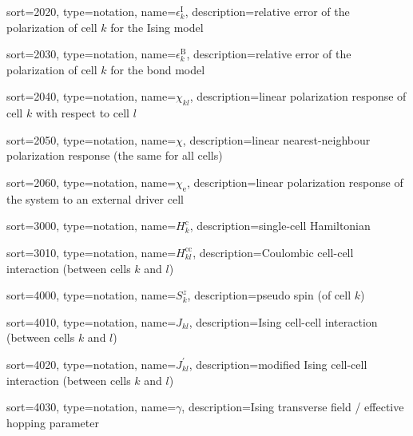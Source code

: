 {
  sort=2020,
  type=notation,
  name={\ensuremath{\epsilon^\text{I}_k}},
  description={relative error of the polarization of cell $k$ for the Ising
  model}
}

{
  sort=2030,
  type=notation,
  name={\ensuremath{\epsilon^\text{B}_k}},
  description={relative error of the polarization of cell $k$ for the bond
  model}
}

{
  sort=2040,
  type=notation,
  name={\ensuremath{\chi_{kl}}},
  description={linear polarization response of cell $k$ with respect to cell $l$}
}

{
  sort=2050,
  type=notation,
  name={\ensuremath{\chi}},
  description={linear nearest-neighbour polarization response (the same for all
  cells)}
}

{
  sort=2060,
  type=notation,
  name={\ensuremath{\chi_\text{e}}},
  description={linear polarization response of the system to an external driver
  cell}
}

{
  sort=3000,
  type=notation,
  name={\ensuremath{H^\text{c}_k}},
  description={single-cell Hamiltonian}
}

{
  sort=3010,
  type=notation,
  name={\ensuremath{H^\text{cc}_{kl}}},
  description={Coulombic cell-cell interaction (between cells $k$ and $l$)}
}

{
  sort=4000,
  type=notation,
  name={\ensuremath{S^z_k}},
  description={pseudo spin (of cell $k$)}
}

{
  sort=4010,
  type=notation,
  name={\ensuremath{J_{kl}}},
  description={Ising cell-cell interaction (between cells $k$ and $l$)}
}

{
  sort=4020,
  type=notation,
  name={\ensuremath{J^{\prime}_{kl}}},
  description={modified Ising cell-cell interaction (between cells $k$ and $l$)}
}

{
  sort=4030,
  type=notation,
  name={\ensuremath{\gamma}},
  description={Ising transverse field / effective hopping parameter}
}

\glsaddall
